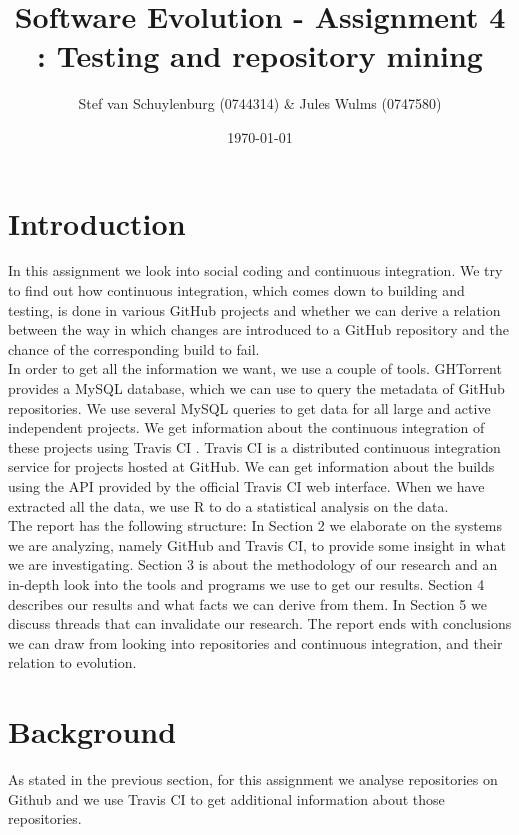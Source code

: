 \documentclass[a4paper,11pt]{article}
\title{Software Evolution - Assignment 4 : Testing and repository mining}
\author{Stef van Schuylenburg (0744314) \& Jules Wulms (0747580)}
\date{\today}
\begin{document}
	\maketitle

	\section{Introduction}
		In this assignment we look into social coding and continuous integration. We try to find out how continuous integration, which comes down to building and testing, is done in various GitHub \cite{github} projects and whether we can derive a relation between the way in which changes are introduced to a GitHub repository and the chance of the corresponding build to fail. \\

		In order to get all the information we want, we use a couple of tools. GHTorrent \cite{ghtorrent} provides a MySQL database, which we can use to query the metadata of GitHub repositories. We use several MySQL queries to get data for all large and active independent projects. We get information about the continuous integration of these projects using Travis CI \cite{travis}. Travis CI is a distributed continuous integration service for projects hosted at GitHub. We can get information about the builds using the API provided by the official Travis CI web interface. When we have extracted all the data, we use R \cite{rstatistic} to do a statistical analysis on the data. \\

		The report has the following structure: In Section 2 we elaborate on the systems we are analyzing, namely GitHub and Travis CI, to provide some insight in what we are investigating. Section 3 is about the methodology of our research and an in-depth look into the tools and programs we use to get our results. Section 4 describes our results and what facts we can derive from them. In Section 5 we discuss threads that can invalidate our research. The report ends with conclusions we can draw from looking into repositories and continuous integration, and their relation to evolution.
	
	\section{Background}
		As stated in the previous section, for this assignment we analyse repositories on Github and we use Travis CI to get
		additional information about those repositories.
		
\end{document}
